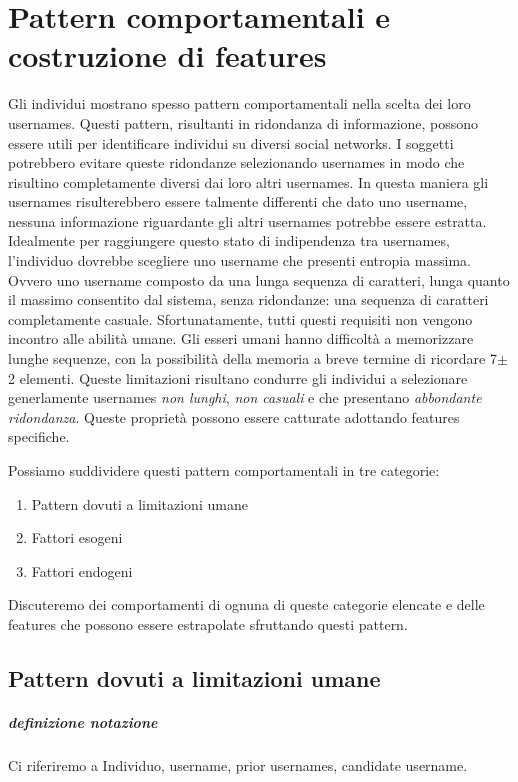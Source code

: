 \chapter{Pattern comportamentali e costruzione di features}
\label{cap2}
Gli individui mostrano spesso pattern comportamentali nella scelta dei loro usernames. Questi pattern, risultanti in ridondanza di informazione, possono essere utili per identificare individui su diversi social networks.
I soggetti potrebbero evitare queste ridondanze selezionando usernames in modo che risultino completamente diversi dai loro altri usernames. In questa maniera gli usernames risulterebbero essere talmente differenti che dato uno username, nessuna informazione riguardante gli altri usernames potrebbe essere estratta.
Idealmente per raggiungere questo stato di indipendenza tra usernames, l'individuo dovrebbe scegliere uno username che presenti entropia massima. Ovvero uno username composto da una lunga sequenza di caratteri, lunga quanto il massimo consentito dal sistema, senza ridondanze: una sequenza di caratteri completamente casuale.
Sfortunatamente, tutti questi requisiti non vengono incontro alle abilità umane. Gli esseri umani hanno difficoltà a memorizzare lunghe sequenze, con la possibilità della memoria a breve termine di ricordare 7$\pm$2 elementi. Queste limitazioni risultano condurre gli individui a selezionare generlamente usernames \textit{non lunghi}, \textit{non casuali} e che presentano \textit{abbondante ridondanza}.
Queste proprietà possono essere catturate adottando features specifiche.

Possiamo suddividere questi pattern comportamentali in tre categorie:
\begin{enumerate}
  \item Pattern dovuti a limitazioni umane
  \item Fattori esogeni
  \item Fattori endogeni
\end{enumerate}

Discuteremo dei comportamenti di ognuna di queste categorie elencate e delle features che possono essere estrapolate sfruttando questi pattern.


\section{Pattern dovuti a limitazioni umane}

\paragraph{definizione notazione}
Ci riferiremo a Individuo, username, prior usernames, candidate username.

